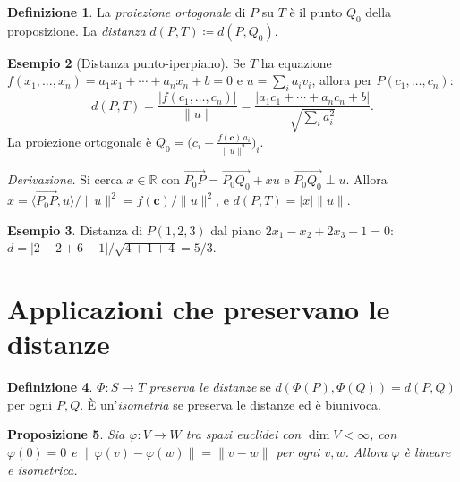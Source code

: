 \documentclass[11pt, a4paper]{book}
\theoremstyle{definition}
\newtheorem{definizione}{Definizione}[section]
\newtheorem{esempio}[definizione]{Esempio}
\theoremstyle{plain}
\newtheorem{proposizione}[definizione]{Proposizione}
\theoremstyle{remark}
\newcommand{\R}{\mathbb{R}}
\begin{document}
\begin{defbox}
\begin{definizione}
La \emph{proiezione ortogonale} di $P$ su $T$ è il punto $Q_0$ della proposizione. La \emph{distanza} $d(P,T) \coloneqq d(P,Q_0)$.
\end{definizione}
\end{defbox}

\begin{exbox}
\begin{esempio}[Distanza punto-iperpiano]
\label{es:distanza-iperpiano}
Se $T$ ha equazione $f(x_1,\ldots,x_n)=a_1x_1+\cdots+a_nx_n+b=0$ e $u=\sum_i a_i v_i$, allora per $P(c_1,\ldots,c_n)$:
\[
  d(P,T) = \frac{|f(c_1,\ldots,c_n)|}{\|u\|} = \frac{|a_1c_1+\cdots+a_nc_n+b|}{\sqrt{\sum_i a_i^2}}.
\]
La proiezione ortogonale è $Q_0 = \bigl(c_i - \tfrac{f(\mathbf{c})\,a_i}{\|u\|^2}\bigr)_i$.

\emph{Derivazione.} Si cerca $x \in \R$ con $\overrightarrow{P_0 P} = \overrightarrow{P_0 Q_0} + xu$ e $\overrightarrow{P_0 Q_0} \perp u$. Allora $x = \langle\overrightarrow{P_0 P},u\rangle/\|u\|^2 = f(\mathbf{c})/\|u\|^2$, e $d(P,T)=|x|\|u\|$.
\end{esempio}
\end{exbox}

\begin{exbox}
\begin{esempio}
Distanza di $P(1,2,3)$ dal piano $2x_1-x_2+2x_3-1=0$: $d = |2-2+6-1|/\sqrt{4+1+4} = 5/3$.
\end{esempio}
\end{exbox}

\section{Applicazioni che preservano le distanze}
\label{sec:preserva-distanze}

\begin{defbox}
\begin{definizione}
$\Phi \colon S \to T$ \emph{preserva le distanze} se $d(\Phi(P),\Phi(Q)) = d(P,Q)$ per ogni $P,Q$. È un'\emph{isometria} se preserva le distanze ed è biunivoca.
\end{definizione}
\end{defbox}

\begin{proposizione}
\label{prop:iso-lineare}
Sia $\varphi \colon V \to W$ tra spazi euclidei con $\dim V < \infty$, con $\varphi(0)=0$ e $\|\varphi(v)-\varphi(w)\|=\|v-w\|$ per ogni $v,w$. Allora $\varphi$ è lineare e isometrica.
\end{proposizione}
\end{document}
